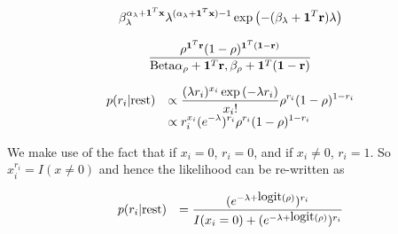 \documentclass{article}[12pt]
\begin{document}
%
%
%


$$
\beta_{\lambda}^{\alpha_\lambda+{\bf 1}^T{\bf x}} \lambda^{(\alpha_\lambda + {\bf 1}^T{\bf x}) - 1} \exp{\left(-(\beta_\lambda + {\bf1}^T{\bf r}) \lambda \right)}
$$

$$
\frac{\rho^{{\bf 1}^T{\bf r}} (1 - \rho)^{{\bf 1}^T({\bf 1} - {\bf r})}}{\text{Beta} \alpha_\rho + {\bf 1}^T {\bf r}, \beta_\rho + {\bf 1}^T({\bf 1} - {\bf r})}
$$

$$
\begin{array}{ll}
p(r_i | \text{rest}) & \displaystyle \propto \frac{(\lambda r_i)^{x_i} \exp{(-\lambda r_i)}}{x_i !} \rho^{r_i} (1 - \rho)^{1 - r_i} \\
& \displaystyle \propto r_i^{x_i} (e^{-\lambda})^{r_i} \rho^{r_i} (1 - \rho)^{1 - r_i}
\end{array}
$$

We make use of the fact that if $x_i = 0$, $r_i = 0$, and if $x_i \ne 0$,
$r_i = 1$. So $x_i^{r_i} = I(x \ne 0)$ and hence the likelihood can be re-written as

$$
\begin{array}{ll}
p(r_i | \text{rest}) & \displaystyle = \frac{(e^{-\lambda + \mbox{logit}{(\rho)}})^{r_i}}{I(x_i = 0) + (e^{-\lambda + \mbox{logit}{(\rho)}})^{r_i}}
\end{array}
$$




\end{document}
